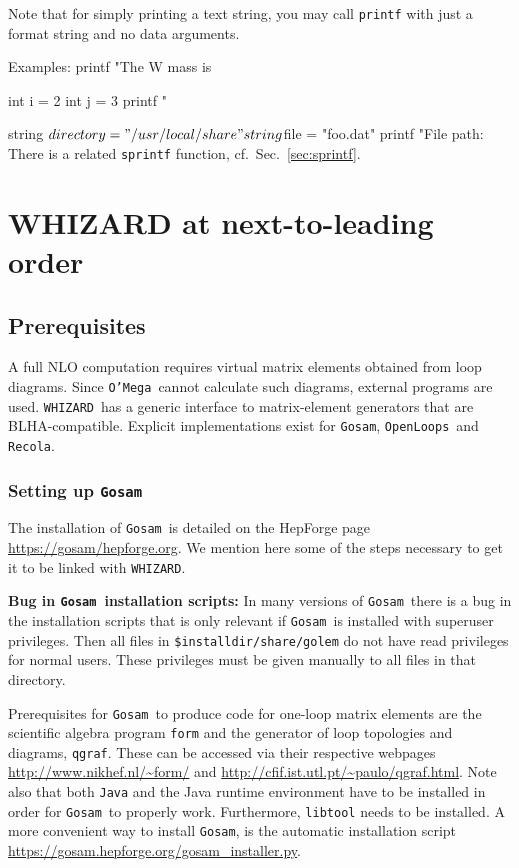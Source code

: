 \documentclass[12pt]{book}
\newenvironment{code}%
  {\begingroup\footnotesize
   \quote
   \Verbatim}%
  {\endVerbatim
   \endquote
   \endgroup\noindent}
\newcommand{\ttt}[1]{\texttt{#1}}
\newcommand{\whizard}{\ttt{WHIZARD}}
\newcommand{\oMega}{\ttt{O'Mega}}
\newcommand{\gosam}{\ttt{Gosam}}
\newcommand{\openloops}{\ttt{OpenLoops}}
\newcommand{\recola}{\ttt{Recola}}
\begin{document}
Note that for simply printing a text string, you may call \ttt{printf} with
just a format string and no data arguments.

Examples:
\begin{code}
printf "The W mass is %

int i = 2
int j = 3
printf "%

string $directory = "/usr/local/share"
string $file = "foo.dat"
printf "File path: %
\end{code}
There is a related \ttt{sprintf} function, cf.~Sec.~\ref{sec:sprintf}.


\section{WHIZARD at next-to-leading order}
\subsection{Prerequisites}
A full NLO computation requires virtual matrix elements obtained from
loop diagrams. Since \oMega\ cannot calculate such diagrams, external
programs are used.  \whizard\ has a generic interface to matrix-element
generators that are BLHA-compatible.
Explicit implementations exist for \gosam, \openloops\ and \recola.


\subsubsection{Setting up \gosam}

The installation of \gosam\ is detailed on the HepForge page
\url{https://gosam/hepforge.org}.  We mention here some of the steps
necessary to get it to be linked with \whizard.

{\bf Bug in \gosam\ installation scripts:} In many versions of
\gosam\ there is a bug in the installation scripts that is only
relevant if \gosam\ is installed with superuser privileges. Then all
files in \ttt{\$installdir/share/golem} do not have read privileges
for normal users. These privileges must be given manually to all files
in that directory.

Prerequisites for \gosam\ to produce code for one-loop matrix elements
are the scientific algebra program \ttt{form} and the generator of
loop topologies and diagrams, \ttt{qgraf}.
These can be accessed via their respective webpages
\url{http://www.nikhef.nl/~form/} and
\url{http://cfif.ist.utl.pt/~paulo/qgraf.html}. Note also that both
\ttt{Java} and the Java runtime environment have to be installed in
order for \gosam\ to properly work.  Furthermore, \ttt{libtool}
needs to be installed.  A more convenient way to install \gosam, is the
automatic installation script
\url{https://gosam.hepforge.org/gosam_installer.py}.
\end{document}
